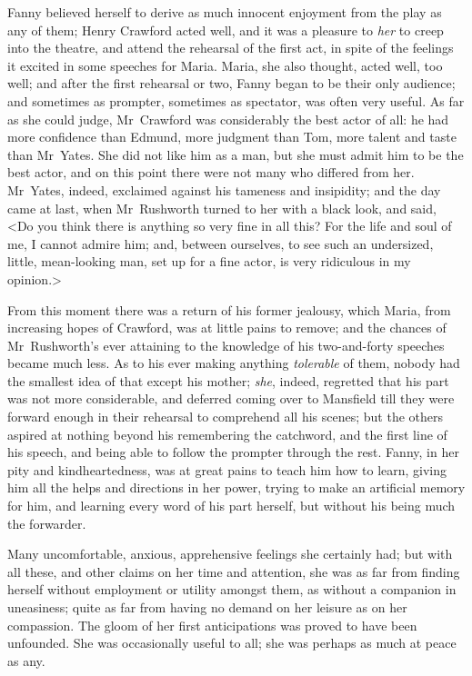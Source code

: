 Fanny believed herself to derive as much innocent enjoyment from the play as any of them; Henry Crawford acted well, and it was a pleasure to \textit{her}  to creep into the theatre, and attend the rehearsal of the first act, in spite of the feelings it excited in some speeches for Maria. Maria, she also thought, acted well, too well; and after the first rehearsal or two, Fanny began to be their only audience; and sometimes as prompter, sometimes as spectator, was often very useful. As far as she could judge, Mr~Crawford was considerably the best actor of all: he had more confidence than Edmund, more judgment than Tom, more talent and taste than Mr~Yates. She did not like him as a man, but she must admit him to be the best actor, and on this point there were not many who differed from her. Mr~Yates, indeed, exclaimed against his tameness and insipidity; and the day came at last, when Mr~Rushworth turned to her with a black look, and said, <Do you think there is anything so very fine in all this? For the life and soul of me, I cannot admire him; and, between ourselves, to see such an undersized, little, mean-looking man, set up for a fine actor, is very ridiculous in my opinion.>

From this moment there was a return of his former jealousy, which Maria, from increasing hopes of Crawford, was at little pains to remove; and the chances of Mr~Rushworth's ever attaining to the knowledge of his two-and-forty speeches became much less. As to his ever making anything \textit{tolerable}  of them, nobody had the smallest idea of that except his mother; \textit{she}, indeed, regretted that his part was not more considerable, and deferred coming over to Mansfield till they were forward enough in their rehearsal to comprehend all his scenes; but the others aspired at nothing beyond his remembering the catchword, and the first line of his speech, and being able to follow the prompter through the rest. Fanny, in her pity and kindheartedness, was at great pains to teach him how to learn, giving him all the helps and directions in her power, trying to make an artificial memory for him, and learning every word of his part herself, but without his being much the forwarder.

Many uncomfortable, anxious, apprehensive feelings she certainly had; but with all these, and other claims on her time and attention, she was as far from finding herself without employment or utility amongst them, as without a companion in uneasiness; quite as far from having no demand on her leisure as on her compassion. The gloom of her first anticipations was proved to have been unfounded. She was occasionally useful to all; she was perhaps as much at peace as any.

